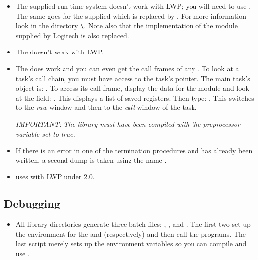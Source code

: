    
\begin{itemize}
\item
    The supplied run-time system  doesn't work
    with LWP; you will need to use .  The
    same goes for the supplied  which is
    replaced by .  For more information
    look in the directory \verb*!\!\-.  Note
    also that the implementation of the module
     supplied by Logitech is also replaced.
\item
    The  doesn't work with LWP.
\item
    The  does work and you can even get the call frames
    of any .  To look at a task's call
    chain, you must have access to the task's pointer.  The
    main task's object is: .
    To access its call frame, display the data for the module
     and look at the field: .
    This displays a list of saved registers.  Then type:
    .  This switches to the {\em raw} window
    and then to the {\em call} window of the task.

    {\em IMPORTANT: The library must have been compiled with the
    preprocessor variable  set to true.}
    
\item
    If there is an error in one of the termination procedures
    and  has already been written, a 
    second dump is taken using the name .
    
\item
     uses  with LWP under 2.0.

\end{itemize}

\subsection{Debugging}
\begin{itemize}
\item
    All library directories generate three batch files: 
    , , and
    .   The first two set up the environment
    for the  and  (respectively) and then
    call the programs.  The last script merely sets up the environment
    variables so you can compile and use .
\end{itemize}

